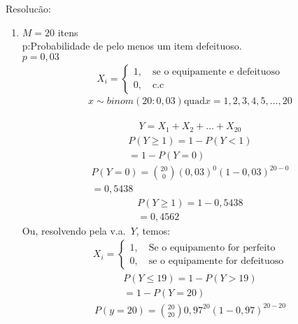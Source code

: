 \documentclass[11pt,a4paper]{book}
\begin{document}
\begin{description}
    \item{Resolucão:}
      \begin{enumerate}[label=(\alph*)]
        \item    $M=20$ itens\\
          p:Probabilidade de pelo menos um item defeituoso.\\
          $p=0,03$
          \begin{align*}
           X_i= \begin{cases}
             1, \quad \text{se o equipamente e defeituoso}\\
             0, \quad \text{c.c }
            \end{cases} 
          \end{align*}
          $$x \sim binom(20:0,03) \text{quad} x=1,2,3,4,5,\dots,20$$\\
          \begin{align*}
           Y=X_1 + X_2 + \ldots +X_20 
          \end{align*}
          \begin{align*}
            P(Y\ge 1)= 1-P(Y<1)\\
            =1-P(Y=0)
          \end{align*}
          \begin{align*}
            P(Y=0)= \binom{20}{0} (0,03)^0 (1-0,03)^{20-0}\\
            =0,5438
          \end{align*}
          \begin{align*}
            P(Y\ge 1)= 1-0,5438\\
            =0,4562
          \end{align*}
          Ou, resolvendo pela v.a.\ $Y$, temos:
\begin{align*}
           X_i= \begin{cases}
             1, \quad \text{Se o equipamento for perfeito} \\
             0, \quad \text{se o equipamente for defeituoso}
            \end{cases} 
          \end{align*}
          \begin{align*}
            P(Y\le 19)=1-P(Y>19)\\
            =1-P(Y=20)
          \end{align*}
          \begin{align*}
            P(y=20)=\binom{20}{20}0,97^{20}(1-0,97)^{20-20}\\

\end{align*}
\end{enumerate}
\end{description}
\end{document}
